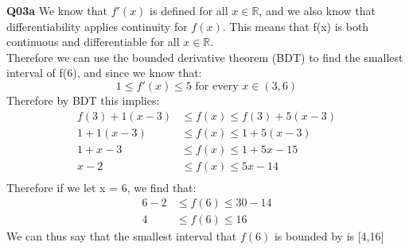 \documentclass[11pt]{article}
\begin{document}
\parindent=0pt

\textbf{Q03a} We know that $f'(x)$ is defined for all $x \in \mathbb{R}$, and we also know that differentiability applies continuity for $f(x)$. This means that f(x) is both continuous and differentiable for all $x \in \mathbb{R}$.\\
Therefore we can use the bounded derivative theorem (BDT) to find the smallest interval of f(6), and since we know that:
\[ 1 \leq f'(x) \leq 5 \text{ for every } x \in (3,6) \]
Therefore by BDT this implies:
\begin{align*}
f(3) + 1(x-3)  & \leq f(x) \leq f(3) + 5(x-3) \\
1 + 1(x-3)  & \leq f(x) \leq 1+ 5(x-3) \\
1 + x-3  & \leq f(x) \leq 1+ 5x-15 \\
x - 2  & \leq f(x) \leq 5x-14 \\
\end{align*}
Therefore if we let x = 6, we find that:
\begin{align*}
6 - 2  & \leq f(6) \leq 30-14 \\
4  & \leq f(6) \leq 16 
\end{align*}
We can thus say that the smallest interval that $f(6)$ is bounded by is [4,16]\\\\\\\\\\\\\\\\\\\\\\\\\\\\\\\\\\\\\\\\\\\\\\\
\end{document}
